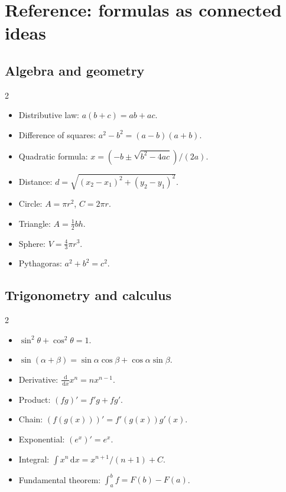\documentclass[11pt,oneside,openany]{book}
\newcommand{\dd}{\,\mathrm{d}}
\begin{document}
\chapter{Reference: formulas as connected ideas}

\section{Algebra and geometry}
\begin{multicols}{2}
\begin{itemize}
  \item Distributive law: $a(b+c)=ab+ac$.
  \item Difference of squares: $a^2-b^2=(a-b)(a+b)$.
  \item Quadratic formula: $x=(-b\pm\sqrt{b^2-4ac})/(2a)$.
  \item Distance: $d=\sqrt{(x_2-x_1)^2+(y_2-y_1)^2}$.
  \item Circle: $A=\pi r^2$, $C=2\pi r$.
  \item Triangle: $A=\frac12 bh$.
  \item Sphere: $V=\frac43\pi r^3$.
  \item Pythagoras: $a^2+b^2=c^2$.
\end{itemize}
\end{multicols}

\section{Trigonometry and calculus}
\begin{multicols}{2}
\begin{itemize}
  \item $\sin^2\theta+\cos^2\theta=1$.
  \item $\sin(\alpha+\beta)=\sin\alpha\cos\beta+\cos\alpha\sin\beta$.
  \item Derivative: $\frac{\dd}{\dd x}x^n=nx^{n-1}$.
  \item Product: $(fg)'=f'g+fg'$.
  \item Chain: $(f(g(x)))'=f'(g(x))g'(x)$.
  \item Exponential: $(e^x)'=e^x$.
  \item Integral: $\int x^n\dd x=x^{n+1}/(n+1)+C$.
  \item Fundamental theorem: $\int_a^b f=F(b)-F(a)$.
\end{itemize}
\end{multicols}
\end{document}

